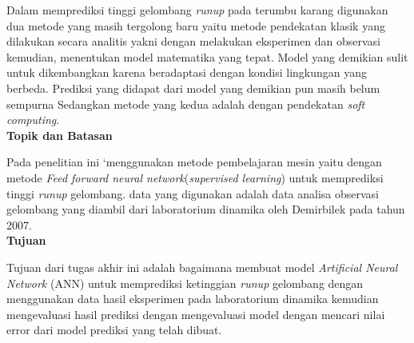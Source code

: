 Dalam memprediksi tinggi gelombang \emph{runup} pada terumbu karang digunakan dua metode yang masih tergolong baru yaitu metode pendekatan klasik yang dilakukan secara analitis yakni dengan melakukan eksperimen dan observasi kemudian, menentukan model matematika yang tepat. Model yang demikian sulit untuk dikembangkan karena beradaptasi dengan kondisi lingkungan yang berbeda. Prediksi yang didapat dari model yang demikian pun masih belum sempurna \cite{DemirbilekBoussinesq} Sedangkan metode yang kedua adalah dengan  pendekatan \emph{soft computing}.\\

{\textbf{Topik dan Batasan}}

Pada penelitian ini `menggunakan metode pembelajaran mesin yaitu dengan metode \emph{Feed forward neural network}(\emph{supervised learning}) untuk memprediksi tinggi \emph{runup} gelombang. data yang digunakan adalah data analisa observasi gelombang yang diambil dari laboratorium dinamika oleh Demirbilek pada tahun 2007\cite{DemirbilekReport}.\\

{\textbf{Tujuan}}

Tujuan dari tugas akhir ini adalah bagaimana membuat model \emph{Artificial Neural Network} (ANN) untuk memprediksi ketinggian \emph{runup} gelombang dengan menggunakan data hasil eksperimen pada laboratorium dinamika kemudian mengevaluasi hasil prediksi dengan mengevaluasi model dengan mencari nilai error dari model prediksi yang telah dibuat.

